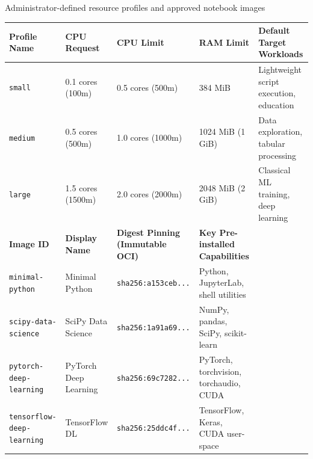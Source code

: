 \begin{table}[ht]{Administrator-defined resource profiles and approved notebook images}
\label{tab:candidate_catalog_spec}
\centering\footnotesize
\begin{tabular}{p{2.5cm}p{2.2cm}p{2.2cm}p{2.2cm}p{4.2cm}}
\toprule
\textbf{Profile Name} & \textbf{CPU Request} & \textbf{CPU Limit} & \textbf{RAM Limit} & \textbf{Default Target Workloads} \\
\midrule
\texttt{small}  & 0.1 cores (100m) & 0.5 cores (500m) & 384 MiB & Lightweight script execution, education \\
\texttt{medium} & 0.5 cores (500m) & 1.0 cores (1000m)& 1024 MiB (1 GiB) & Data exploration, tabular processing \\
\texttt{large}  & 1.5 cores (1500m)& 2.0 cores (2000m)& 2048 MiB (2 GiB) & Classical ML training, deep learning \\
\midrule
\textbf{Image ID} & \textbf{Display Name} & \textbf{Digest Pinning (Immutable OCI)} & \textbf{Key Pre-installed Capabilities} \\
\midrule
\texttt{minimal-python}   & Minimal Python       & \texttt{sha256:a153ceb...} & Python, JupyterLab, shell utilities \\
\texttt{scipy-data-science}& SciPy Data Science  & \texttt{sha256:1a91a69...} & NumPy, pandas, SciPy, scikit-learn \\
\texttt{pytorch-deep-learning}& PyTorch Deep Learning & \texttt{sha256:69c7282...} & PyTorch, torchvision, torchaudio, CUDA \\
\texttt{tensorflow-deep-learning}& TensorFlow DL   & \texttt{sha256:25ddc4f...} & TensorFlow, Keras, CUDA user-space \\
\bottomrule
\end{tabular}
\end{table}
